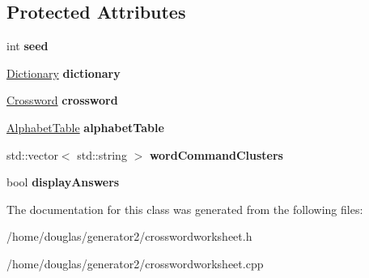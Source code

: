 \subsection*{Protected Attributes}
\begin{DoxyCompactItemize}
\item 
int {\bfseries seed}\hypertarget{classCrosswordWorksheet_ac209b0c433b65f48bda15b9b214b068b}{}\label{classCrosswordWorksheet_ac209b0c433b65f48bda15b9b214b068b}

\item 
\hyperlink{classDictionary}{Dictionary} {\bfseries dictionary}\hypertarget{classCrosswordWorksheet_a27a603575ccdad7641e889fc2d86a0ae}{}\label{classCrosswordWorksheet_a27a603575ccdad7641e889fc2d86a0ae}

\item 
\hyperlink{classCrossword}{Crossword} {\bfseries crossword}\hypertarget{classCrosswordWorksheet_aca55a414575d6ebbdcbfb1f4b92761c1}{}\label{classCrosswordWorksheet_aca55a414575d6ebbdcbfb1f4b92761c1}

\item 
\hyperlink{classAlphabetTable}{Alphabet\+Table} {\bfseries alphabet\+Table}\hypertarget{classCrosswordWorksheet_afc3406772bf2414fb0d1639f324ed250}{}\label{classCrosswordWorksheet_afc3406772bf2414fb0d1639f324ed250}

\item 
std\+::vector$<$ std\+::string $>$ {\bfseries word\+Command\+Clusters}\hypertarget{classCrosswordWorksheet_a998510a83bc44f411880708806b3db57}{}\label{classCrosswordWorksheet_a998510a83bc44f411880708806b3db57}

\item 
bool {\bfseries display\+Answers}\hypertarget{classCrosswordWorksheet_afc79a534c0add705a7e12d5698cc90ce}{}\label{classCrosswordWorksheet_afc79a534c0add705a7e12d5698cc90ce}

\end{DoxyCompactItemize}


The documentation for this class was generated from the following files\+:\begin{DoxyCompactItemize}
\item 
/home/douglas/generator2/crosswordworksheet.\+h\item 
/home/douglas/generator2/crosswordworksheet.\+cpp\end{DoxyCompactItemize}
